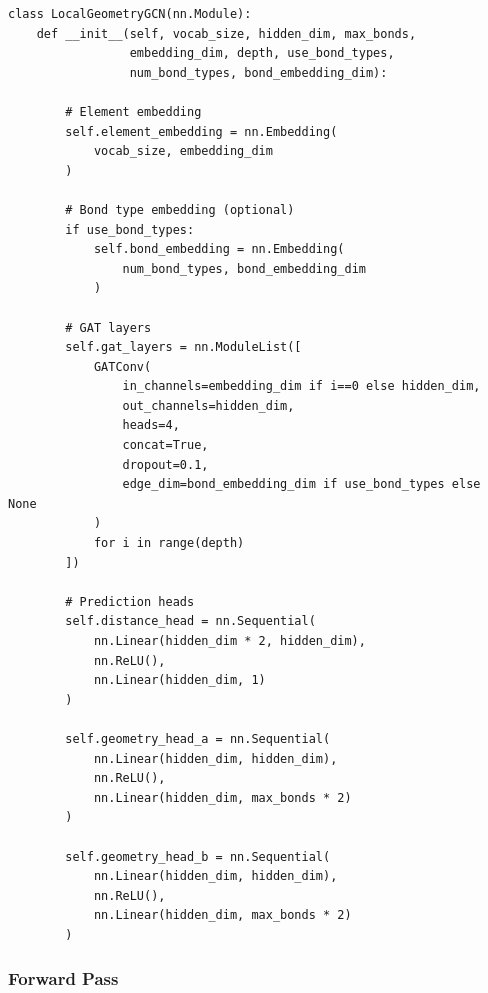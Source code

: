 \documentclass[11pt,a4paper]{article}
\begin{document}
\begin{lstlisting}
class LocalGeometryGCN(nn.Module):
    def __init__(self, vocab_size, hidden_dim, max_bonds,
                 embedding_dim, depth, use_bond_types,
                 num_bond_types, bond_embedding_dim):

        # Element embedding
        self.element_embedding = nn.Embedding(
            vocab_size, embedding_dim
        )

        # Bond type embedding (optional)
        if use_bond_types:
            self.bond_embedding = nn.Embedding(
                num_bond_types, bond_embedding_dim
            )

        # GAT layers
        self.gat_layers = nn.ModuleList([
            GATConv(
                in_channels=embedding_dim if i==0 else hidden_dim,
                out_channels=hidden_dim,
                heads=4,
                concat=True,
                dropout=0.1,
                edge_dim=bond_embedding_dim if use_bond_types else None
            )
            for i in range(depth)
        ])

        # Prediction heads
        self.distance_head = nn.Sequential(
            nn.Linear(hidden_dim * 2, hidden_dim),
            nn.ReLU(),
            nn.Linear(hidden_dim, 1)
        )

        self.geometry_head_a = nn.Sequential(
            nn.Linear(hidden_dim, hidden_dim),
            nn.ReLU(),
            nn.Linear(hidden_dim, max_bonds * 2)
        )

        self.geometry_head_b = nn.Sequential(
            nn.Linear(hidden_dim, hidden_dim),
            nn.ReLU(),
            nn.Linear(hidden_dim, max_bonds * 2)
        )
\end{lstlisting}

\subsubsection{Forward Pass}
\end{document}
